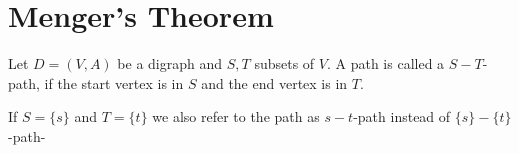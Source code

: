 \begin{lec}[2011-12-01]\end{lec}

\section*{Menger's Theorem}

\begin{defn}
Let $D = (V, A)$ be a digraph and $S, T$ subsets of $V$.
A path is called a $S-T$-path, if the start vertex is in $S$ and the end
vertex is in $T$.

If $S = \{s\}$ and $T = \{t\}$ we also refer to the path as $s-t$-path
instead of $\{s\}-\{t\}$-path-
\end{defn}
